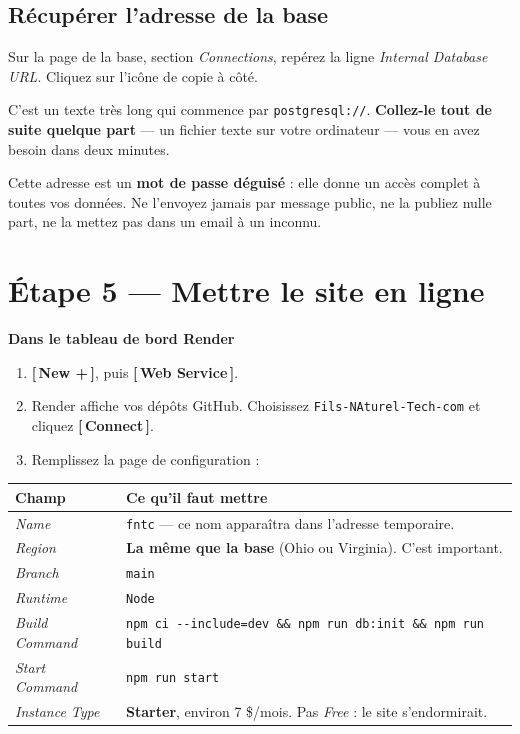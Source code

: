 \documentclass[11pt,a4paper]{article}
\newcommand{\bouton}[1]{\textbf{\textcolor{sig}{[\,#1\,]}}}
\newcommand{\champ}[1]{\textit{#1}}
\newcommand{\saisir}[1]{\texttt{#1}}
\begin{document}
\subsection{Récupérer l'adresse de la base}

Sur la page de la base, section \champ{Connections}, repérez la ligne
\champ{Internal Database URL}. Cliquez sur l'icône de copie à côté.

C'est un texte très long qui commence par \saisir{postgresql://}. \textbf{Collez-le
tout de suite quelque part} — un fichier texte sur votre ordinateur — vous en
avez besoin dans deux minutes.

\begin{attention}
Cette adresse est un \textbf{mot de passe déguisé} : elle donne un accès complet
à toutes vos données. Ne l'envoyez jamais par message public, ne la publiez
nulle part, ne la mettez pas dans un email à un inconnu.
\end{attention}

\section{Étape 5 — Mettre le site en ligne}

\begin{etape}
\textbf{Dans le tableau de bord Render}
\end{etape}

\begin{enumerate}
  \item \bouton{New +}, puis \bouton{Web Service}.
  \item Render affiche vos dépôts GitHub. Choisissez
        \saisir{Fils-NAturel-Tech-com} et cliquez \bouton{Connect}.
  \item Remplissez la page de configuration :
\end{enumerate}

\begin{center}
\begin{tabularx}{\textwidth}{@{}lX@{}}
\toprule
\textbf{Champ} & \textbf{Ce qu'il faut mettre} \\
\midrule
\champ{Name} & \saisir{fntc} — ce nom apparaîtra dans l'adresse temporaire. \\
\champ{Region} & \textbf{La même que la base} (Ohio ou Virginia). C'est important. \\
\champ{Branch} & \saisir{main} \\
\champ{Runtime} & \saisir{Node} \\
\champ{Build Command} & \saisir{npm ci -{}-include=dev \&\& npm run db:init \&\& npm run build} \\
\champ{Start Command} & \saisir{npm run start} \\
\champ{Instance Type} & \textbf{Starter}, environ 7 \$/mois. Pas \champ{Free} : le site s'endormirait. \\
\bottomrule
\end{tabularx}
\end{center}
\end{document}
